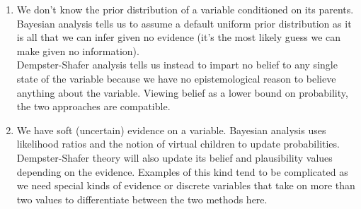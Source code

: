 \documentclass[letterpaper]{article}
\begin{document}
\begin{enumerate}
\item We don't know the prior distribution of a variable conditioned on its parents.  Bayesian analysis tells us to assume a default uniform prior distribution as it is all that we can infer given no evidence (it's the most likely guess we can make given no information).  \\
Dempster-Shafer analysis tells us instead to impart no belief to any single state of the variable because we have no epistemological reason to believe anything about the variable.  Viewing belief as a lower bound on probability, the two approaches are compatible.

\item We have soft (uncertain) evidence on a variable.  Bayesian analysis uses likelihood ratios and the notion of virtual children to update probabilities.  Dempster-Shafer theory will also update its belief and plausibility values depending on the evidence.  Examples of this kind tend to be complicated as we need special kinds of evidence or discrete variables that take on more than two values to differentiate between the two methods here.
\end{enumerate}
\end{document}
